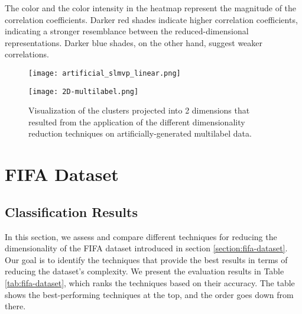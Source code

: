 The color and the color intensity in the heatmap represent the magnitude of the correlation coefficients. Darker red shades indicate higher correlation coefficients, indicating a stronger resemblance between the reduced-dimensional representations. Darker blue shades, on the other hand, suggest weaker correlations.

\begin{figure}
    \centering
    \texttt{[image: artificial\_slmvp\_linear.png]}
    \caption{}
    \label{fig:artificial_slmvp_linear}
\end{figure}




\begin{figure}
    \centering
    \texttt{[image: 2D-multilabel.png]}
    \caption{Visualization of the clusters projected into 2 dimensions that resulted from the application of the different dimensionality reduction techniques on artificially-generated multilabel data.}
    \label{fig:2D_multilabel}
\end{figure}

\section{FIFA Dataset}\label{section:fifa}

\subsection{Classification Results}

In this section, we assess and compare different techniques for reducing the dimensionality of the FIFA dataset introduced in section \ref{section:fifa-dataset}. Our goal is to identify the techniques that provide the best results in terms of reducing the dataset's complexity. We present the evaluation results in Table \ref{tab:fifa-dataset}, which ranks the techniques based on their accuracy. The table shows the best-performing techniques at the top, and the order goes down from there.


